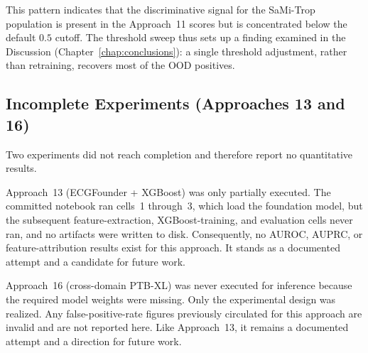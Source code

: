 This pattern indicates that the discriminative signal for the SaMi-Trop
population is present in the Approach~11 scores but is concentrated below the
default $0.5$ cutoff. The threshold sweep thus sets up a finding examined in the
Discussion (Chapter~\ref{chap:conclusions}): a single threshold adjustment,
rather than retraining, recovers most of the OOD positives.

\subsection{Incomplete Experiments (Approaches 13 and 16)}\label{sec:results_incomplete}

Two experiments did not reach completion and therefore report no quantitative
results.

Approach~13 (ECGFounder + XGBoost) was only partially executed. The committed
notebook ran cells~1 through~3, which load the foundation model, but the
subsequent feature-extraction, XGBoost-training, and evaluation cells never ran,
and no artifacts were written to disk. Consequently, no AUROC, AUPRC, or
feature-attribution results exist for this approach. It stands as a documented
attempt and a candidate for future work.

Approach~16 (cross-domain PTB-XL) was never executed for inference because the required
model weights were missing. Only the experimental design was realized. Any
false-positive-rate figures previously circulated for this approach are invalid
and are not reported here. Like Approach~13, it remains a documented attempt and
a direction for future work.
